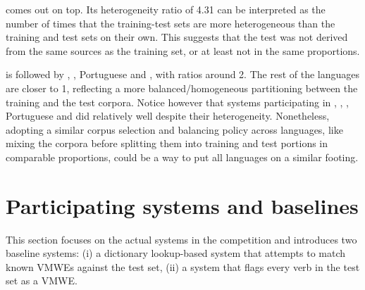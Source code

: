 \documentclass[output=paper
,modfonts
,nonflat,draftmode]{langsci/langscibook}
\begin{document}
 comes out on top. Its heterogeneity ratio of 4.31 can be interpreted as the number of times that the training-test sets are more heterogeneous than the training and test sets on their own. This suggests that the  test was not derived from the same sources as the training set, or at least not in the same proportions.

 is followed by , , Portuguese and , with ratios around 2. The rest of the languages are closer to 1, reflecting a more balanced/homogeneous partitioning between the training and the test corpora. Notice however that systems participating in , , , Portuguese and  did relatively well despite their heterogeneity. Nonetheless, adopting a similar corpus selection and balancing policy across languages, like mixing the corpora before splitting them into training and test portions in comparable proportions, could be a way to put all languages on a similar footing.

\section{\label{sec:systems}Participating systems and baselines}

This section focuses on the actual systems in the competition and introduces two baseline systems: (i) a dictionary lookup-based system that attempts to match known VMWEs against the test set, (ii) a system that flags every verb in the test set as a VMWE.
\end{document}
